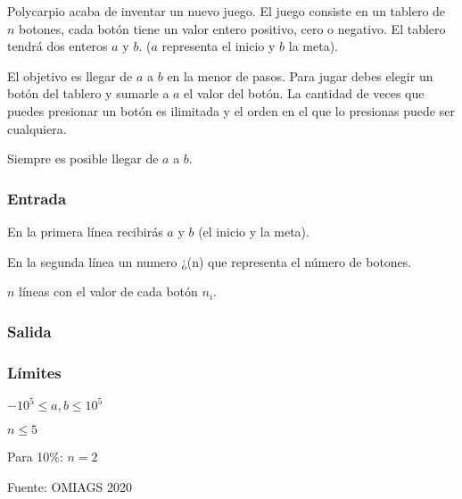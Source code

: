 Polycarpio acaba de inventar un nuevo juego. El juego consiste en un tablero de \(n\) botones, cada botón tiene un valor entero positivo, cero o negativo. El tablero tendrá dos enteros \(a\) y \(b\). (\(a\) representa el inicio y \(b\) la meta).

El objetivo es llegar de \(a\) a \(b\) en la menor de pasos. Para jugar debes elegir un botón del tablero y sumarle a \(a\) el valor del botón. La cantidad de veces que puedes presionar un botón es ilimitada y el orden en el que lo presionas puede ser cualquiera.

Siempre es posible llegar de \(a\) a \(b\).

\subsubsection*{Entrada}
En la primera línea recibirás \(a\) y \(b\) (el inicio y la meta).

En la segunda línea un numero ¿(n) que representa el número de botones.

\(n\) líneas con el valor de cada botón \(n_i\).

\subsubsection*{Salida}	
\begin{casebox3}
\end{casebox3}
\subsubsection*{Límites}
\begin{plimits}
	\item \(-10^5 \leq a,b \leq 10^5\)
	\item \(n \leq 5\)
\end{plimits}

Para 10\%:  \(n = 2\)

Fuente: OMIAGS 2020

